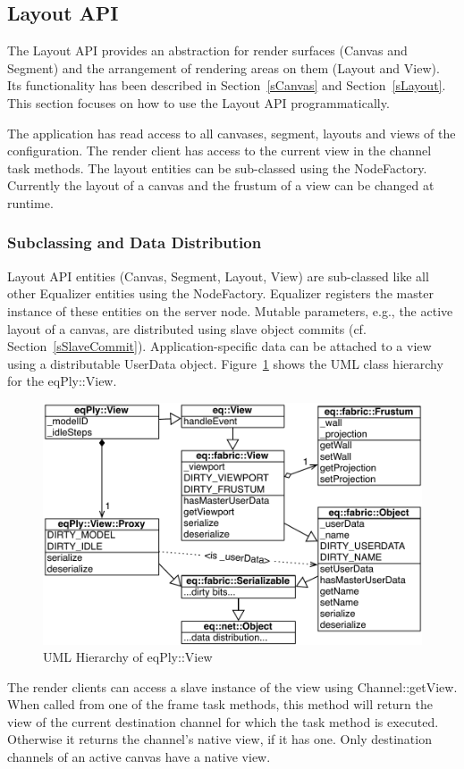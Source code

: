 \documentclass[10pt,a4]{scrartcl}
\newcommand{\fig}[1]{Figure~\ref{#1}}
\newcommand{\sref}[1]{Section~\ref{#1}}
\begin{document}
\subsection{\label{sLayoutAPI}Layout API}

The Layout API provides an abstraction for render surfaces (Canvas and
Segment) and the arrangement of rendering areas on them (Layout and
View). Its functionality has been described in \sref{sCanvas} and
\sref{sLayout}. This section focuses on how to use the Layout API
programmatically. 

The application has read access to all canvases, segment, layouts and
views of the configuration. The render client has access to the current
view in the channel task methods. The layout entities can be sub-classed
using the \textsf{NodeFactory}. Currently the layout of a canvas and the
frustum of a view can be changed at runtime.


\subsubsection{Subclassing and Data Distribution}

Layout API entities (Canvas, Segment, Layout, View) are sub-classed like all
other Equalizer entities using the \textsf{NodeFactory}. Equalizer registers the
master instance of these entities on the server node. Mutable parameters, e.g.,
the active layout of a canvas, are distributed using slave object commits
(cf. \sref{sSlaveCommit}). Application-specific data can be attached to a view
using a distributable \textsf{UserData} object. \fig{fViewUML} shows the UML
class hierarchy for the \textsf{eqPly::View}.

\begin{figure}
  \includegraphics[width=.612\textwidth]{images/viewUML.pdf}
  {\caption{\label{fViewUML}UML Hierarchy of \textsf{eqPly::View}}}
\end{figure}
The render clients can access a slave instance of the view using
\textsf{Channel::getView}. When called from one of the frame task
methods, this method will return the view of the current destination
channel for which the task method is executed. Otherwise it returns the
channel's native view, if it has one. Only destination channels of an
active canvas have a native view.
\end{document}
